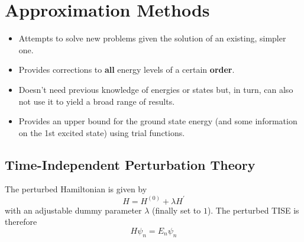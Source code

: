 \section{Approximation Methods}

\begin{itemize}
    \item Attempts to solve new problems given the solution of an existing, simpler one.
    \item Provides corrections to \textbf{all} energy levels of a certain \textbf{order}.
\end{itemize}
\begin{itemize}
    \item Doesn't need previous knowledge of energies or states but, in turn, can also not use it to yield a broad range of results.
    \item Provides an upper bound for the ground state energy (and some information on the 1st excited state) using trial functions.
\end{itemize}

\subsection{Time-Independent Perturbation Theory}
The perturbed Hamiltonian is given by
\begin{equation*}
    H=H^{(0)}+\lambda H^{\prime}
\end{equation*}
with an adjustable dummy parameter $\lambda$ (finally set to $1$). The perturbed TISE is therefore
\begin{equation*}
    H\psi_n = E_n \psi_n
\end{equation*}

